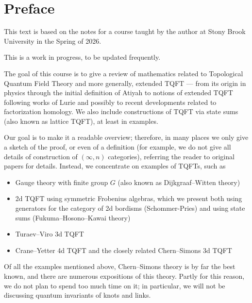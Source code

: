 \chapter*{Preface}\label{c:preface}
This text is based on the notes for a course taught by the
author at Stony Brook University in the Spring of 2026.

This is a work in progress, to be updated frequently.


The goal of this course is to give a review of mathematics related
to Topological Quantum Field Theory and more generally, extended TQFT ---
from its origin in physics through the initial definition of Atiyah to notions
of extended TQFT following works of Lurie and possibly to recent
developments related to factorization homology. We also
include constructions of TQFT via state sums (also known as lattice
TQFT), at least in examples.

Our goal is to make it a readable overview; therefore, in many places we only
give a sketch of the proof, or even of a definition (for example, we do not give
all details of construction of $(\infty, n)$ categories),  referring the
reader to original papers for details. Instead, we concentrate on examples of
TQFTs, such as
\begin{itemize}
  \item Gauge theory with finite group $G$ (also known as Dijkgraaf--Witten
  theory)
  \item 2d TQFT using symmetric Frobenius algebras, which we present both using
  generators for the category of 2d bordisms (Schommer-Pries)
  and using state sums
  (Fukuma--Hosono--Kawai theory)
  \item Turaev--Viro 3d TQFT
  \item Crane--Yetter 4d TQFT and the closely related Chern--Simons 3d TQFT
\end{itemize}

Of all the examples mentioned above, Chern--Simons theory is by far the best
known, and there are numerous expositions of this theory. Partly for this
reason, we do not plan to spend too much time on it; in particular, we will not
be discussing quantum invariants of knots and links.




\clearpage

